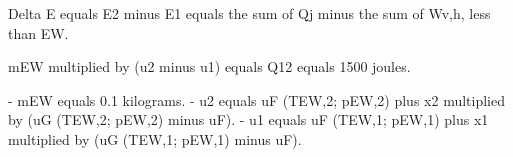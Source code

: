 Delta E equals E2 minus E1 equals the sum of Qj minus the sum of Wv,h, less than EW.  

mEW multiplied by (u2 minus u1) equals Q12 equals 1500 joules.  

- mEW equals 0.1 kilograms.  
- u2 equals uF (TEW,2; pEW,2) plus x2 multiplied by (uG (TEW,2; pEW,2) minus uF).  
- u1 equals uF (TEW,1; pEW,1) plus x1 multiplied by (uG (TEW,1; pEW,1) minus uF).
